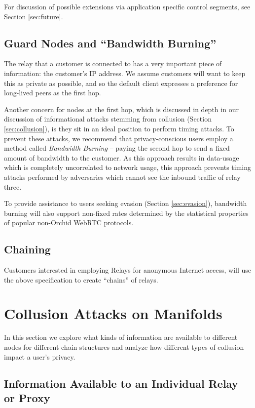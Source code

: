 \documentclass{article}
\newcommand{\orchid}{Orchid}
\newcommand{\Orchid}{\orchid}
\begin{document}
For discussion of possible extensions via application specific control
segments, see Section \ref{sec:future}.

\subsection{Guard Nodes and ``Bandwidth Burning''}
\label{bandwidth-burning}

The relay that a customer is connected to has a very important piece
of information: the customer’s IP address. We assume customers will
want to keep this as private as possible, and so the default client
expresses a preference for long-lived peers as the first
hop.

Another concern for nodes at the first hop, which is discussed in
depth in our discussion of informational attacks stemming from
collusion (Section \ref{sec:collusion}), is they sit in an ideal
position to perform timing attacks. To prevent these attacks, we
recommend that privacy-conscious users employ a method called
\emph{Bandwidth Burning} -- paying the second hop to send a fixed
amount of bandwidth to the customer. As this approach results in
data-usage which is completely uncorrelated to network usage, this
approach prevents timing attacks performed by adversaries which cannot
see the inbound traffic of relay three.

To provide assistance to users seeking evasion (Section
\ref{sec:evasion}), bandwidth burning will also support non-fixed
rates determined by the statistical properties of popular non-\Orchid
WebRTC protocols.

\subsection{Chaining}

Customers interested in employing Relays for anonymous Internet
access, will use the above specification to create ``chains'' of
relays.

\section{Collusion Attacks on Manifolds}

In this section we explore what kinds of information are available to
different nodes for different chain structures and analyze how
different types of collusion impact a user's privacy.

\subsection{Information Available to an Individual Relay or Proxy}
\label{relay-proxy-info-known}
\end{document}
